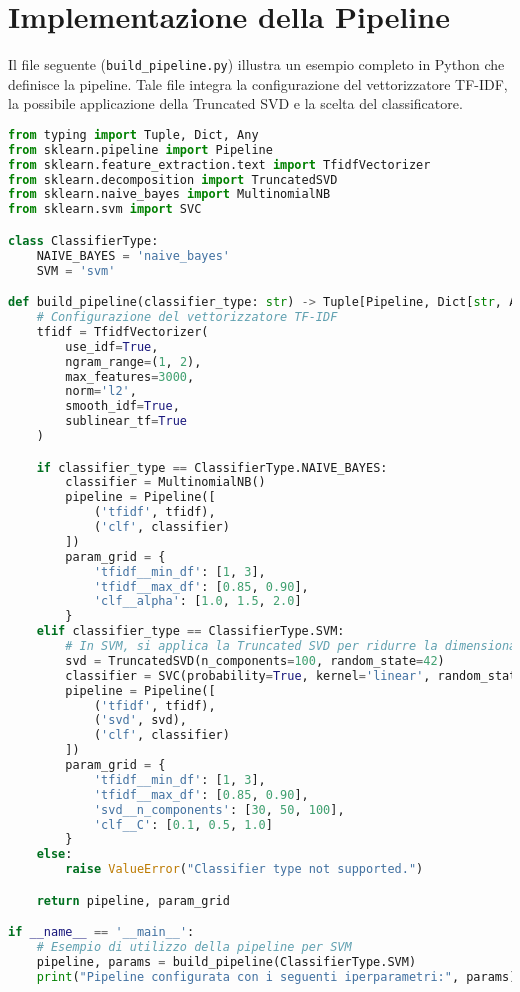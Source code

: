 \section{Implementazione della Pipeline}
Il file seguente (\texttt{build\_pipeline.py}) illustra un esempio completo in Python che definisce la pipeline. Tale file integra la configurazione del vettorizzatore TF-IDF, la possibile applicazione della Truncated SVD e la scelta del classificatore.

\begin{lstlisting}[language=Python,caption={File pipeline.py}]
from typing import Tuple, Dict, Any
from sklearn.pipeline import Pipeline
from sklearn.feature_extraction.text import TfidfVectorizer
from sklearn.decomposition import TruncatedSVD
from sklearn.naive_bayes import MultinomialNB
from sklearn.svm import SVC

class ClassifierType:
    NAIVE_BAYES = 'naive_bayes'
    SVM = 'svm'

def build_pipeline(classifier_type: str) -> Tuple[Pipeline, Dict[str, Any]]:
    # Configurazione del vettorizzatore TF-IDF
    tfidf = TfidfVectorizer(
        use_idf=True,
        ngram_range=(1, 2),
        max_features=3000,
        norm='l2',
        smooth_idf=True,
        sublinear_tf=True
    )

    if classifier_type == ClassifierType.NAIVE_BAYES:
        classifier = MultinomialNB()
        pipeline = Pipeline([
            ('tfidf', tfidf),
            ('clf', classifier)
        ])
        param_grid = {
            'tfidf__min_df': [1, 3],
            'tfidf__max_df': [0.85, 0.90],
            'clf__alpha': [1.0, 1.5, 2.0]
        }
    elif classifier_type == ClassifierType.SVM:
        # In SVM, si applica la Truncated SVD per ridurre la dimensionalità
        svd = TruncatedSVD(n_components=100, random_state=42)
        classifier = SVC(probability=True, kernel='linear', random_state=42)
        pipeline = Pipeline([
            ('tfidf', tfidf),
            ('svd', svd),
            ('clf', classifier)
        ])
        param_grid = {
            'tfidf__min_df': [1, 3],
            'tfidf__max_df': [0.85, 0.90],
            'svd__n_components': [30, 50, 100],
            'clf__C': [0.1, 0.5, 1.0]
        }
    else:
        raise ValueError("Classifier type not supported.")

    return pipeline, param_grid

if __name__ == '__main__':
    # Esempio di utilizzo della pipeline per SVM
    pipeline, params = build_pipeline(ClassifierType.SVM)
    print("Pipeline configurata con i seguenti iperparametri:", params)
\end{lstlisting}

